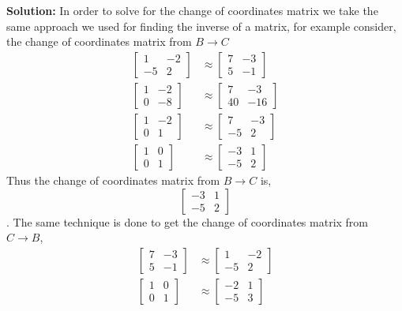 \documentclass{amsart}
\begin{document}
\noindent \textbf{Solution: } In order to solve for the change of coordinates matrix we take the same approach we used for finding the inverse of a matrix, for example consider, the change of coordinates matrix from $B \to C$
 \begin{align}
 \begin{bmatrix}
 1&-2\\
 -5&2
 \end{bmatrix}
&\approx 
  \begin{bmatrix}
 7&-3\\
 5&-1
 \end{bmatrix}\\
  \begin{bmatrix}
 1&-2\\
 0&-8
 \end{bmatrix}
&\approx 
  \begin{bmatrix}
 7&-3\\
 40&-16
 \end{bmatrix}\\
   \begin{bmatrix}
 1&-2\\
 0&1
 \end{bmatrix}
&\approx 
  \begin{bmatrix}
 7&-3\\
 -5&2
 \end{bmatrix}\\
   \begin{bmatrix}
 1&0\\
 0&1
 \end{bmatrix}
&\approx 
  \begin{bmatrix}
-3&1\\
 -5&2
 \end{bmatrix}
 \end{align}
 Thus the change of coordinates matrix from $B \to C$ is,
\begin{equation*}
  \begin{bmatrix}
-3&1\\
 -5&2
 \end{bmatrix}
\end{equation*}.
The same technique is done to get the change of coordinates matrix from $C \to B$,
\begin{align}
\begin{bmatrix}
 7&-3\\
 5&-1
 \end{bmatrix}
&\approx 
 \begin{bmatrix}
 1&-2\\
 -5&2
 \end{bmatrix}\\
\begin{bmatrix}
 1&0\\
0&1
 \end{bmatrix}
&\approx 
 \begin{bmatrix}
 -2&1\\
 -5&3
 \end{bmatrix}
 \end{align}
\end{document}

